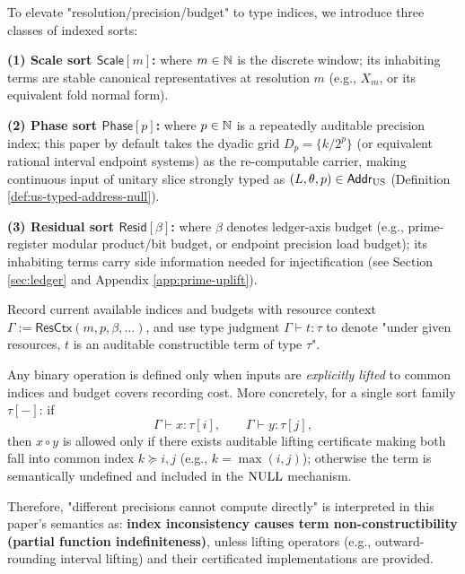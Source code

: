 \begin{definition}\label{def:indexed-sorts-resctx}
To elevate "resolution/precision/budget" to type indices, we introduce three classes of indexed sorts:\par
\noindent\textbf{(1) Scale sort $\mathsf{Scale}[m]$:} where $m\in\mathbb{N}$ is the discrete window; its inhabiting terms are stable canonical representatives at resolution $m$ (e.g., $X_m$, or its equivalent fold normal form).\par
\noindent\textbf{(2) Phase sort $\mathsf{Phase}[p]$:} where $p\in\mathbb{N}$ is a repeatedly auditable precision index; this paper by default takes the dyadic grid $D_p=\{k/2^p\}$ (or equivalent rational interval endpoint systems) as the re-computable carrier, making continuous input of unitary slice strongly typed as $(L,\theta,p)\in\mathsf{Addr}_{\mathrm{US}}$ (Definition \ref{def:us-typed-address-null}).\par
\noindent\textbf{(3) Residual sort $\mathsf{Resid}[\beta]$:} where $\beta$ denotes ledger-axis budget (e.g., prime-register modular product/bit budget, or endpoint precision load budget); its inhabiting terms carry side information needed for injectification (see Section \ref{sec:ledger} and Appendix \ref{app:prime-uplift}).\par
Record current available indices and budgets with resource context $\Gamma:=\mathsf{ResCtx}(m,p,\beta,\dots)$, and use type judgment $\Gamma\vdash t:\tau$ to denote "under given resources, $t$ is an auditable constructible term of type $\tau$".\par
\end{definition}

\begin{definition}\label{def:common-refinement-type-failure}
Any binary operation is defined only when inputs are \emph{explicitly lifted} to common indices and budget covers recording cost. More concretely, for a single sort family $\tau[-]$: if
$$
\Gamma\vdash x:\tau[i],\qquad \Gamma\vdash y:\tau[j],
$$
then $x\circ y$ is allowed only if there exists auditable lifting certificate making both fall into common index $k\succeq i,j$ (e.g., $k=\max(i,j)$); otherwise the term is semantically undefined and included in the $\mathrm{NULL}$ mechanism.\par
Therefore, "different precisions cannot compute directly" is interpreted in this paper's semantics as: \textbf{index inconsistency causes term non-constructibility (partial function indefiniteness)}, unless lifting operators (e.g., outward-rounding interval lifting) and their certificated implementations are provided.\par
\end{definition}

